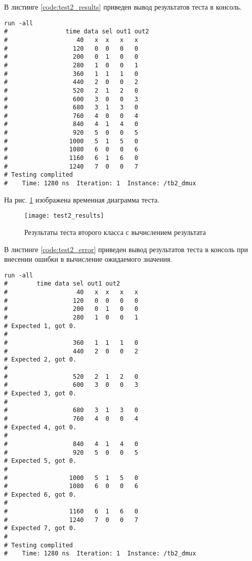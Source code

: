 В листинге \ref{code:test2_results} приведен вывод результатов теста в консоль.
\begin{lstlisting}[caption=Результаты теста второго класса с вычислением результата, label=code:test2_results, style=console]
run -all
# 		         time data sel out1 out2
#                   40   x  x   x   x
#                  120   0  0   0   0
#                  200   0  1   0   0
#                  280   1  0   0   1
#                  360   1  1   1   0
#                  440   2  0   0   2
#                  520   2  1   2   0
#                  600   3  0   0   3
#                  680   3  1   3   0
#                  760   4  0   0   4
#                  840   4  1   4   0
#                  920   5  0   0   5
#                 1000   5  1   5   0
#                 1080   6  0   0   6
#                 1160   6  1   6   0
#                 1240   7  0   0   7
# Testing complited
#    Time: 1280 ns  Iteration: 1  Instance: /tb2_dmux
\end{lstlisting}

На рис. \ref{fig:test2_results} изображена временная диаграмма теста.
\vspace{-0.5cm}
\begin{figure}[H]
	\begin{center}
		\texttt{[image: test2\_results]}
		\caption{Результаты теста второго класса с вычислением результата}
		\label{fig:test2_results}
	\end{center}
\end{figure}
\vspace{-1cm}

В листинге \ref{code:test2_error} приведен вывод результатов теста в консоль при внесении ошибки в вычисление ожидаемого значения.	
\begin{lstlisting}[caption=Результаты ошибочного теста второго класса с вычислением результата, label=code:test2_error, style=console]
run -all
# 		 time data sel out1 out2
#                   40   x  x   x   x
#                  120   0  0   0   0
#                  200   0  1   0   0
#                  280   1  0   0   1
# Expected 1, got 0.
# 
#                  360   1  1   1   0
#                  440   2  0   0   2
# Expected 2, got 0.
# 
#                  520   2  1   2   0
#                  600   3  0   0   3
# Expected 3, got 0.
# 
#                  680   3  1   3   0
#                  760   4  0   0   4
# Expected 4, got 0.
# 
#                  840   4  1   4   0
#                  920   5  0   0   5
# Expected 5, got 0.
# 
#                 1000   5  1   5   0
#                 1080   6  0   0   6
# Expected 6, got 0.
# 
#                 1160   6  1   6   0
#                 1240   7  0   0   7
# Expected 7, got 0.
# 
# Testing complited
#    Time: 1280 ns  Iteration: 1  Instance: /tb2_dmux
\end{lstlisting}
\vspace{-0.5cm}

